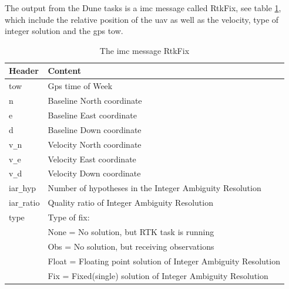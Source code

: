 The output from the Dune tasks is a \gls{imc} message called RtkFix, see table \ref{Tb:RtkFix}, which include the relative position of the \gls{uav} as well as the velocity, type of integer solution and the \gls{gps} \acrfull{tow}.
\begin{table}[!h]
\begin{center}
    \begin{tabular}{ | l | l |}
    \hline
    \textbf{Header} & \textbf{Content} \\ \hline
     tow & Gps time of Week  \\ \hline
     n & Baseline North coordinate \\ \hline
     e & Baseline East coordinate \\ \hline
     d & Baseline Down coordinate \\ \hline
     v\verb=_=n & Velocity North coordinate \\ \hline
     v\verb=_=e & Velocity East coordinate \\ \hline
     v\verb=_=d & Velocity Down coordinate \\ \hline
     iar\verb=_=hyp & Number of hypotheses in the Integer Ambiguity Resolution \\ \hline
     iar\verb=_=ratio & Quality ratio of Integer Ambiguity Resolution \\ \hline
     type & Type of fix: \\& None = No solution, but RTK task is running
     \\& Obs = No solution, but receiving observations
     \\& Float = Floating point solution of Integer Ambiguity Resolution
     \\& Fix = Fixed(single) solution of Integer Ambiguity Resolution \\ \hline
    \end{tabular}
\end{center}
\caption{The \gls{imc} message RtkFix }
\label{Tb:RtkFix}
\end{table}

